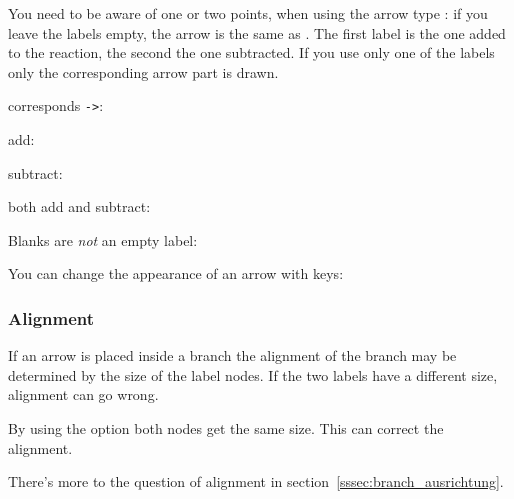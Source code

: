 \documentclass[toc=index,DIV10]{cnpkgdoc}
\begin{document}
You need to be aware of one or two points, when using the arrow type \code{-+>}:
if you leave the labels empty, the arrow is the same as \code{->}. The first label
is the one added to the reaction, the second the one subtracted. If you use only
one of the labels only the corresponding arrow part is drawn.
\begin{beispiel}
 corresponds \verb"->":
 \begin{rxn}
  \arrow[,-+>]{}{}
 \end{rxn}
 add:
 \begin{rxn}
 \end{rxn}
 subtract:
 \begin{rxn}
 \end{rxn}
 both add and subtract:
 \begin{rxn}
 \end{rxn}
 Blanks are \emph{not} an empty label:
 \begin{rxn}
  \arrow[,-+>]{ }{ }
 \end{rxn}
\end{beispiel}

You can change the appearance of an arrow with \TikZ keys:
\begin{beispiel}
 \begin{rxn}
 \end{rxn}
\end{beispiel}

\subsubsection{Alignment}
If an arrow is placed inside a branch the alignment of the branch may be
determined by the size of the label nodes. If the two labels have a different
size, alignment can go wrong.
\begin{beispiel}
 \makevisible
 \begin{rxn}
  \arrow{}{}
 \end{rxn}
 \makeinvisible
\end{beispiel}
By using the option  both nodes get the same size. This can correct
the alignment.
\begin{beispiel}
 \makevisible
 \begin{rxn}
  \arrow{}{}
 \end{rxn}
 \makeinvisible
\end{beispiel}
There's more to the question of alignment in section~\ref{sssec:branch_ausrichtung}.
\end{document}
